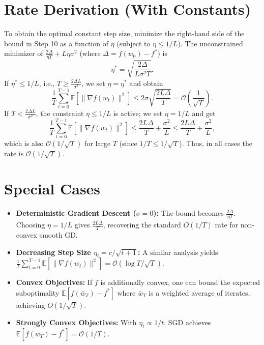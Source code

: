 \documentclass{article}
\begin{document}
\section*{Rate Derivation (With Constants)}
To obtain the optimal constant step size, minimize the right-hand side of the bound in Step 10 as a function of $\eta$ (subject to $\eta \le 1/L$). The unconstrained minimizer of $\frac{2\Delta}{\eta T} + L\eta\sigma^2$ (where $\Delta = f(w_0)-f^*$) is
\begin{equation}
    \eta^* = \sqrt{\frac{2\Delta}{L\sigma^2 T}}.
\end{equation}
If $\eta^* \le 1/L$, i.e., $T \ge \frac{2\Delta L}{\sigma^2}$, we set $\eta = \eta^*$ and obtain
\begin{equation}
    \frac{1}{T} \sum_{t=0}^{T-1} \mathbb{E}[\|\nabla f(w_t)\|^2] \le 2\sigma\sqrt{\frac{2L\Delta}{T}} = \mathcal{O}\!\left(\frac{1}{\sqrt{T}}\right).
\end{equation}
If $T < \frac{2\Delta L}{\sigma^2}$, the constraint $\eta \le 1/L$ is active; we set $\eta = 1/L$ and get
\begin{equation}
    \frac{1}{T} \sum_{t=0}^{T-1} \mathbb{E}[\|\nabla f(w_t)\|^2] \le \frac{2L\Delta}{T} + \frac{\sigma^2}{L} \le \frac{2L\Delta}{T} + \frac{\sigma^2}{L},
\end{equation}
which is also $\mathcal{O}(1/\sqrt{T})$ for large $T$ (since $1/T \le 1/\sqrt{T}$). Thus, in all cases the rate is $\mathcal{O}(1/\sqrt{T})$.

\section*{Special Cases}
\begin{itemize}
    \item \textbf{Deterministic Gradient Descent ($\sigma=0$):} The bound becomes $\frac{2\Delta}{\eta T}$. Choosing $\eta = 1/L$ gives $\frac{2L\Delta}{T}$, recovering the standard $O(1/T)$ rate for non-convex smooth GD.
    \item \textbf{Decreasing Step Size $\eta_t = c/\sqrt{t+1}$:} A similar analysis yields $\frac{1}{T}\sum_{t=0}^{T-1}\mathbb{E}[\|\nabla f(w_t)\|^2] = \mathcal{O}(\log T / \sqrt{T})$.
    \item \textbf{Convex Objectives:} If $f$ is additionally convex, one can bound the expected suboptimality $\mathbb{E}[f(\bar{w}_T) - f^*]$ where $\bar{w}_T$ is a weighted average of iterates, achieving $O(1/\sqrt{T})$.
    \item \textbf{Strongly Convex Objectives:} With $\eta_t \propto 1/t$, SGD achieves $\mathbb{E}[f(w_T) - f^*] = \mathcal{O}(1/T)$.
\end{itemize}
\end{document}
